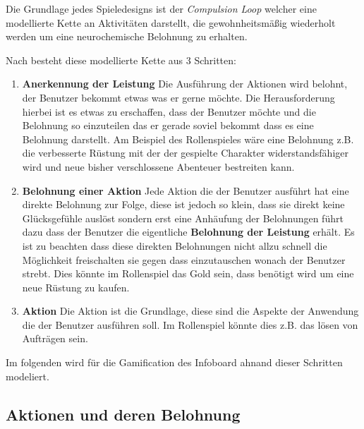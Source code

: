 \documentclass[12pt,twoside]{book}
\begin{document}

Die Grundlage jedes Spieledesigns ist der \textit{Compulsion Loop} welcher eine modellierte Kette an Aktivitäten darstellt, die gewohnheitsmäßig wiederholt werden um eine neurochemische Belohnung zu erhalten.

Nach \citep{gamasutra} besteht diese modellierte Kette aus 3 Schritten:

\begin{enumerate}
  \item \textbf{Anerkennung der Leistung} Die Ausführung der Aktionen wird belohnt, der Benutzer bekommt etwas was er gerne möchte. Die Herausforderung hierbei ist es etwas zu erschaffen, dass der Benutzer möchte und die Belohnung so einzuteilen das er gerade soviel bekommt dass es eine Belohnung darstellt. Am Beispiel des Rollenspieles wäre eine Belohnung z.B. die verbesserte Rüstung mit der der gespielte Charakter widerstandsfähiger wird und neue bisher verschlossene Abenteuer bestreiten kann.
  \item \textbf{Belohnung einer Aktion} Jede Aktion die der Benutzer ausführt hat eine direkte Belohnung zur Folge, diese ist jedoch so klein, dass sie direkt keine Glücksgefühle auslöst sondern erst eine Anhäufung der Belohnungen führt dazu dass der Benutzer die eigentliche \textbf{Belohnung der Leistung} erhält. Es ist zu beachten dass diese direkten Belohnungen nicht allzu schnell die Möglichkeit freischalten sie gegen dass einzutauschen wonach der Benutzer strebt. Dies könnte im Rollenspiel das Gold sein, dass benötigt wird um eine neue Rüstung zu kaufen.
  \item \textbf{Aktion} Die Aktion ist die Grundlage, diese sind die Aspekte der Anwendung die der Benutzer ausführen soll. Im Rollenspiel könnte dies z.B. das lösen von Aufträgen sein.
\end{enumerate}

Im folgenden wird für die Gamification des Infoboard ahnand dieser Schritten modeliert.

\subsection{Aktionen und deren Belohnung}
\end{document}
